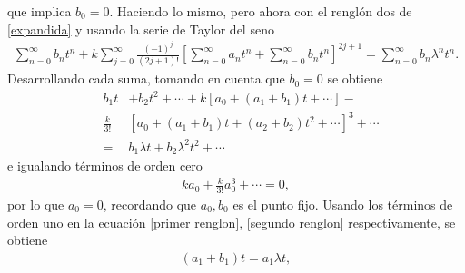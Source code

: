 que implica $b_{0}=0$. Haciendo lo mismo, pero ahora con el renglón dos de \eqref{expandida} y 
usando la serie de Taylor del seno
\begin{eqnarray}
\sum_{n=0}^{\infty}b_{n}t^{n} +k\sum_{j=0}^{\infty}\frac{(-1)^{j}}{(2j+1)!}\left[ \sum_{n=0}^{\infty}a_{n}t^{n} +\sum_{n=0}^{\infty}b_{n}t^{n}\right]^{2j+1}=\sum_{n=0}^{\infty}b_{n}\lambda^{n}t^{n}.
\label{seno exapandido 2}
\end{eqnarray}
Desarrollando cada suma, tomando en cuenta que $b_{0}=0$ se obtiene
\begin{eqnarray}
&b_{1}t&+b_{2}t^{2}+\cdots+k\left[a_{0}+(a_{1}+b_{1})t+\cdots\right]-\nonumber\\
&\frac{k}{3!}&\left[a_{0}+(a_{1}+b_{1})t+(a_{2}+b_{2})t^{2}+\cdots\right]^{3}+\cdots\nonumber\\
&=&b_{1}\lambda t+b_{2}\lambda^{2}t^{2}+\cdots
\label{segundo renglon}
\end{eqnarray}
e igualando términos de orden cero
\begin{eqnarray}
k a_{0}+\frac{k}{3!}a_{0}^{3}+\cdots=0, 
\end{eqnarray}
por lo que $a_{0}=0$, recordando que $a_{0},b_{0}$ es el punto fijo. Usando los términos de orden uno en la ecuación \eqref{primer renglon}, \eqref{segundo renglon} respectivamente, se obtiene
\begin{eqnarray}
(a_{1}+b_{1})t=a_{1}\lambda t,
\end{eqnarray}

